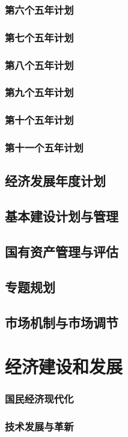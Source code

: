 \documentclass[UTF8]{../../RepresentationUniverse}
\begin{document}
        \subsubsection{第六个五年计划}
        \subsubsection{第七个五年计划}
        \subsubsection{第八个五年计划}
        \subsubsection{第九个五年计划}
        \subsubsection{第十个五年计划}
        \subsubsection{第十一个五年计划}
    \subsection{经济发展年度计划}
    \subsection{基本建设计划与管理}
    \subsection{国有资产管理与评估}
    \subsection{专题规划}
    \subsection{市场机制与市场调节}

\section{经济建设和发展}
    \subsubsection{国民经济现代化}
    \subsubsection{技术发展与革新}
\end{document}
